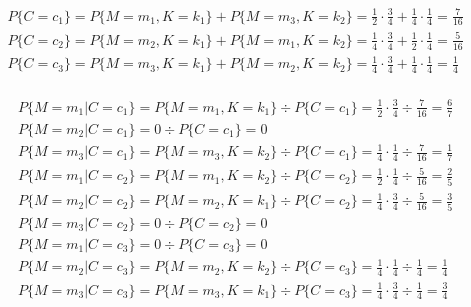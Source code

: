   \begin{align*}
    & P\{C = c_1\} = P\{M = m_1, K = k_1\} + P\{M = m_3, K = k_2\} = \frac{1}{2} \cdot \frac{3}{4} + \frac{1}{4} \cdot \frac{1}{4} = \frac{7}{16}\\
    & P\{C = c_2\} = P\{M = m_2, K = k_1\} + P\{M = m_1, K = k_2\} = \frac{1}{4} \cdot \frac{3}{4} + \frac{1}{2} \cdot \frac{1}{4} = \frac{5}{16}\\
    & P\{C = c_3\} = P\{M = m_3, K = k_1\} + P\{M = m_2, K = k_2\} = \frac{1}{4} \cdot \frac{3}{4} + \frac{1}{4} \cdot \frac{1}{4} = \frac{1}{4}\\
  \end{align*}

  \begin{align*}
    & P\{M = m_1 | C = c_1\} = P\{M = m_1, K = k_1\} \div P\{C = c_1\} = \frac{1}{2} \cdot \frac{3}{4} \div \frac{7}{16} = \frac{6}{7}\\
    & P\{M = m_2 | C = c_1\} = 0 \div P\{C = c_1\} = 0\\
    & P\{M = m_3 | C = c_1\} = P\{M = m_3, K = k_2\} \div P\{C = c_1\} = \frac{1}{4} \cdot \frac{1}{4} \div \frac{7}{16} = \frac{1}{7}\\
    & P\{M = m_1 | C = c_2\} = P\{M = m_1, K = k_2\} \div P\{C = c_2\} = \frac{1}{2} \cdot \frac{1}{4} \div \frac{5}{16} = \frac{2}{5}\\
    & P\{M = m_2 | C = c_2\} = P\{M = m_2, K = k_1\} \div P\{C = c_2\} = \frac{1}{4} \cdot \frac{3}{4} \div \frac{5}{16} = \frac{3}{5}\\
    & P\{M = m_3 | C = c_2\} = 0 \div P\{C = c_2\} = 0\\
    & P\{M = m_1 | C = c_3\} = 0 \div P\{C = c_3\} = 0\\
    & P\{M = m_2 | C = c_3\} = P\{M = m_2, K = k_2\} \div P\{C = c_3\} = \frac{1}{4} \cdot \frac{1}{4} \div \frac{1}{4} = \frac{1}{4}\\
    & P\{M = m_3 | C = c_3\} = P\{M = m_3, K = k_1\} \div P\{C = c_3\} = \frac{1}{4} \cdot \frac{3}{4} \div \frac{1}{4} = \frac{3}{4}\\
  \end{align*}

